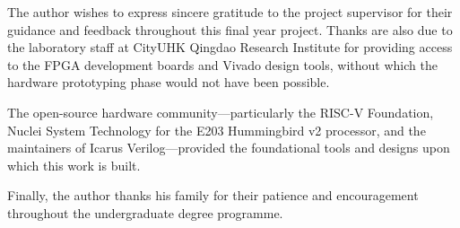 The author wishes to express sincere gratitude to the project supervisor for their guidance and feedback throughout this final year project. Thanks are also due to the laboratory staff at CityUHK Qingdao Research Institute for providing access to the FPGA development boards and Vivado design tools, without which the hardware prototyping phase would not have been possible.

The open-source hardware community---particularly the RISC-V Foundation, Nuclei System Technology for the E203 Hummingbird v2 processor, and the maintainers of Icarus Verilog---provided the foundational tools and designs upon which this work is built.

Finally, the author thanks his family for their patience and encouragement throughout the undergraduate degree programme.

